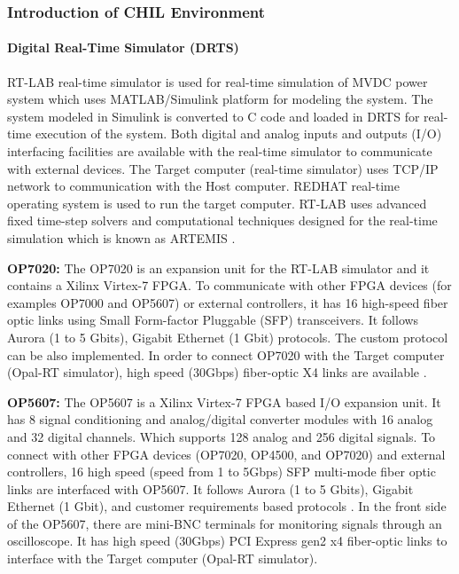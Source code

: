 \subsubsection{Introduction of CHIL Environment}
\paragraph{Digital Real-Time Simulator (DRTS)}
RT-LAB real-time simulator is used for real-time simulation of MVDC power system which uses MATLAB/Simulink platform for modeling the system. The system modeled in Simulink is converted to C code and loaded in DRTS for real-time execution of the system. Both digital and analog inputs and outputs (I/O) interfacing facilities are available with the real-time simulator to communicate with external devices. The Target computer (real-time simulator) uses TCP/IP network to communication with the Host computer. REDHAT real-time operating system is used to run the target computer. RT-LAB uses advanced fixed time-step solvers and computational techniques designed for the real-time simulation which is known as ARTEMIS \cite{mikkili2015review}. 

   
{\textbf{OP7020: }}The OP7020 is an expansion unit for the RT-LAB simulator and it contains a Xilinx Virtex-7 FPGA. To communicate with other FPGA devices (for examples OP7000 and OP5607) or external controllers, it has 16 high-speed fiber optic links using Small Form-factor Pluggable (SFP) transceivers. It follows Aurora (1 to 5 Gbits), Gigabit Ethernet (1 Gbit) protocols. The custom protocol can be also implemented. In order to connect OP7020  with the Target computer (Opal-RT simulator), high speed (30Gbps) fiber-optic X4 links are available \cite{FPGA_EXP}. 


{\textbf{OP5607: }}The OP5607 is a Xilinx Virtex-7 FPGA based I/O expansion unit. It has 8 signal conditioning and analog/digital converter modules with 16 analog and 32 digital channels. Which supports 128 analog and 256 digital signals. To connect with other FPGA devices (OP7020, OP4500, and OP7020) and external controllers, 16 high speed (speed from 1 to 5Gbps) SFP multi-mode fiber optic links are interfaced with OP5607.  It follows Aurora (1 to 5 Gbits), Gigabit Ethernet (1 Gbit), and customer requirements based protocols \cite{FPGA_EXP}. In the front side of the OP5607, there are mini-BNC terminals for monitoring signals through an oscilloscope. It has high speed (30Gbps) PCI Express gen2 x4 fiber-optic links to interface with the Target computer (Opal-RT simulator). 
